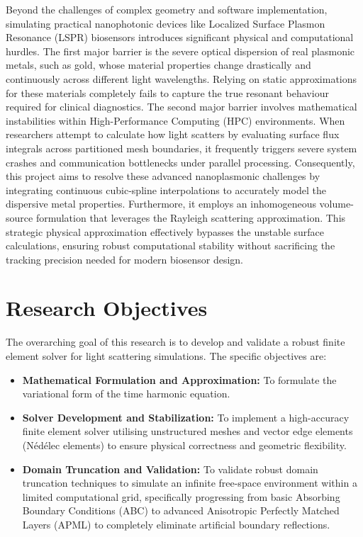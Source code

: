 \documentclass[class=report, crop=false]{standalone}
\begin{document}
Beyond the challenges of complex geometry and software implementation, simulating practical nanophotonic devices like Localized Surface Plasmon Resonance (LSPR) biosensors introduces significant physical and computational hurdles. The first major barrier is the severe optical dispersion of real plasmonic metals, such as gold, whose material properties change drastically and continuously across different light wavelengths. Relying on static approximations for these materials completely fails to capture the true resonant behaviour required for clinical diagnostics. The second major barrier involves mathematical instabilities within High-Performance Computing (HPC) environments. When researchers attempt to calculate how light scatters by evaluating surface flux integrals across partitioned mesh boundaries, it frequently triggers severe system crashes and communication bottlenecks under parallel processing. Consequently, this project aims to resolve these advanced nanoplasmonic challenges by integrating continuous cubic-spline interpolations to accurately model the dispersive metal properties. Furthermore, it employs an inhomogeneous volume-source formulation that leverages the Rayleigh scattering approximation. This strategic physical approximation effectively bypasses the unstable surface calculations, ensuring robust computational stability without sacrificing the tracking precision needed for modern biosensor design.

\section{Research Objectives}

The overarching goal of this research is to develop and validate a robust finite element solver for light scattering simulations. The specific objectives are:

\begin{itemize}
    \item \textbf{Mathematical Formulation and Approximation:} To formulate the variational form of the time harmonic equation.
    
    \item \textbf{Solver Development and Stabilization:} To implement a high-accuracy finite element solver utilising unstructured meshes and vector edge elements (Nédélec elements) \citep{Nedelec1980} to ensure physical correctness and geometric flexibility.
    
    \item \textbf{Domain Truncation and Validation:} To validate robust domain truncation techniques to simulate an infinite free-space environment within a limited computational grid, specifically progressing from basic Absorbing  Boundary Conditions (ABC) to advanced Anisotropic Perfectly Matched Layers (APML) to completely eliminate artificial boundary reflections.
\end{itemize}
\end{document}
